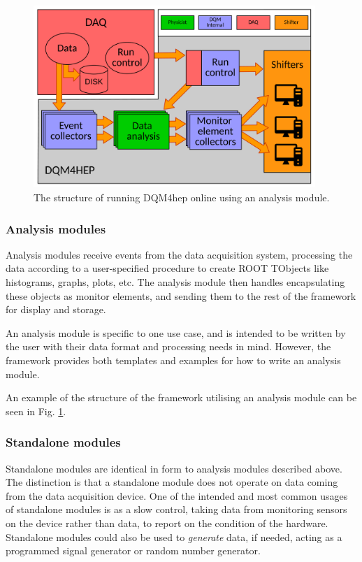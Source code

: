 \begin{figure}[p]
	\centering
	\includegraphics[width=0.95\textwidth]{../Pictures/AnalysisModuleArchitecture.pdf}
	\caption{The structure of running \acrshort{DQM4hep} online using an analysis module.}
	\label{figure:daq/dqm4hep/analysis-module}
\end{figure}

\subsubsection{Analysis modules}
Analysis modules receive events from the data acquisition system, processing the data according to a user-specified procedure to create ROOT TObjects like histograms, graphs, plots, etc. The analysis module then handles encapsulating these objects as monitor elements, and sending them to the rest of the framework for display and storage. 

An analysis module is specific to one use case, and is intended to be written by the user with their data format and processing needs in mind. However, the framework provides both templates and examples for how to write an analysis module. 

An example of the structure of the framework utilising an analysis module can be seen in Fig. \ref{figure:daq/dqm4hep/analysis-module}.

\subsubsection{Standalone modules}
Standalone modules are identical in form to analysis modules described above. The distinction is that a standalone module does not operate on data coming from the data acquisition device. One of the intended and most common usages of standalone modules is as a slow control, taking data from monitoring sensors on the device rather than data, to report on the condition of the hardware. Standalone modules could also be used to \emph{generate} data, if needed, acting as a programmed signal generator or random number generator. 

